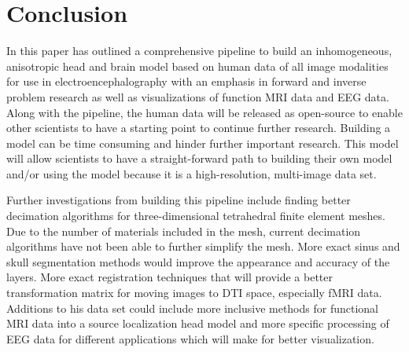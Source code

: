 %
%

\section{Conclusion}
\label{sec:Conclusion}

In this paper has outlined a comprehensive pipeline to build an inhomogeneous, anisotropic head and brain model based on human data of all image modalities for use in electroencephalography with an emphasis in forward and inverse problem research as well as visualizations of function MRI data and EEG data. Along with the pipeline, the human data will be released as open-source to enable other scientists to have a starting point to continue further research. Building a model can be time consuming and hinder further important research. This model will allow scientists to have a straight-forward path to building their own model and/or using the model because it is a high-resolution, multi-image data set.

Further investigations from building this pipeline include finding better decimation algorithms for three-dimensional tetrahedral finite element meshes. Due to the number of materials included in the mesh, current decimation algorithms have not been able to further simplify the mesh. More exact sinus and skull segmentation methods would improve the appearance and accuracy of the layers. More exact registration techniques that will provide a better transformation matrix for moving images to DTI space, especially fMRI data. Additions to his data set could include more inclusive methods for functional MRI data into a source localization head model and more specific processing of EEG data for different applications which will make for better visualization. 